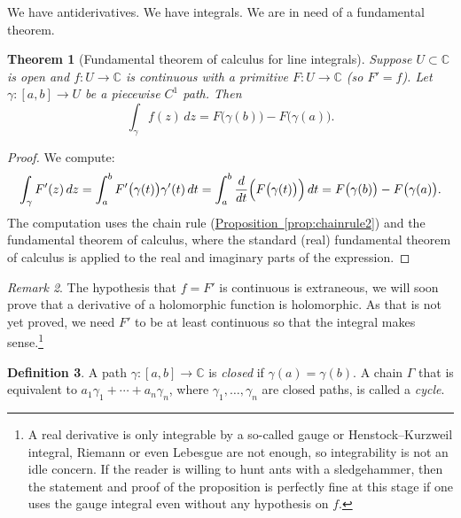 \documentclass[12pt,openany]{book}
\newcommand{\C}{{\mathbb{C}}}
\newcommand{\myindex}[1]{#1\index{#1}}
\theoremstyle{plain}
\newtheorem{thm}{Theorem}[section]
\theoremstyle{remark}
\newtheorem{remark}[thm]{Remark}
\theoremstyle{definition}
\newtheorem{defn}[thm]{Definition}
\theoremstyle{exercise}
\theoremstyle{example}
\newcommand{\propref}[1]{\hyperref[#1]{Proposition~\ref*{#1}}}
\begin{document}
We have antiderivatives.  We have integrals.  We are in need of a
fundamental theorem.

\begin{thm}[Fundamental theorem of calculus for line integrals]
%
Suppose $U \subset \C$ is open and $f \colon U \to \C$
is continuous with a primitive $F \colon U \to \C$ (so $F' = f$).
Let $\gamma \colon [a,b] \to U$ be a piecewise $C^1$ path.
Then
\begin{equation*}
\int_\gamma f(z) \, dz =
F\bigl( \gamma(b) \bigr) - F\bigl( \gamma(a)
\bigr) .
\end{equation*}
\end{thm}

\begin{proof}
We compute:
\begin{equation*}
\int_\gamma F'(z) \, dz
=
\int_a^b F'\bigl(\gamma(t)\bigr) \gamma'(t) \, dt 
=
\int_a^b \frac{d}{dt} \Bigl( F\bigl(\gamma(t)\bigr) \Bigr) \, dt 
=
F\bigl( \gamma(b) \bigr) - F\bigl( \gamma(a) \bigr) .
\end{equation*}
The computation uses the chain rule (\propref{prop:chainrule2})
and the fundamental theorem of calculus, where the
standard (real) fundamental theorem of calculus is applied to the real and imaginary parts
of the expression.
\end{proof}

\begin{remark}
The hypothesis that $f=F'$ is continuous is extraneous,
we will soon prove that a derivative of a holomorphic function is
holomorphic.  As that is not yet proved, we need $F'$ to be at least
continuous so that the integral makes sense.\footnote{%
A real derivative is only integrable
by a so-called gauge or Henstock--Kurzweil integral, Riemann or
even Lebesgue are not enough, so integrability is not an idle concern.
If the reader is willing to hunt ants with a sledgehammer, then
the statement and proof of the proposition is perfectly fine at this stage
if one uses the gauge integral even without any hypothesis on $f$.}
\end{remark}

\begin{defn}
A path $\gamma \colon [a,b] \to \C$ is \emph{closed} if 
$\gamma(a) = \gamma(b)$.
A chain $\Gamma$ that is equivalent to
$a_1 \gamma_1 + \cdots + a_n \gamma_n$, where $\gamma_1, \ldots, \gamma_n$
are closed paths,
is called a \emph{\myindex{cycle}}.
\end{defn}
\end{document}
